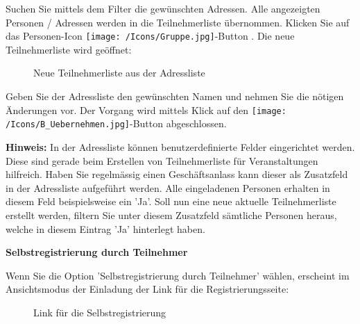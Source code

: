 Suchen Sie mittels dem Filter  die gewünschten Adressen. Alle angezeigten Personen / Adressen  werden in die Teilnehmerliste übernommen. Klicken Sie auf das Personen-Icon \texttt{[image: /Icons/Gruppe.jpg]}-Button .
Die neue Teilnehmerliste wird geöffnet:

\begin{figure}[H]
\caption{Neue Teilnehmerliste aus der Adressliste}
\end{figure}

Geben Sie der Adressliste den gewünschten Namen und nehmen Sie die nötigen Änderungen vor. Der Vorgang wird mittels Klick auf den \texttt{[image: /Icons/B\_Uebernehmen.jpg]}-Button  abgeschlossen.

\vspace{\baselineskip}

\textbf{Hinweis:} In der Adressliste können benutzerdefinierte Felder eingerichtet werden. Diese sind gerade beim Erstellen von Teilnehmerliste für Veranstaltungen hilfreich. Haben Sie regelmässig einen Geschäftsanlass kann dieser als Zusatzfeld in der Adressliste aufgeführt werden. Alle eingeladenen Personen erhalten in diesem Feld beispielsweise ein 'Ja'. Soll nun eine neue aktuelle Teilnehmerliste erstellt werden, filtern Sie unter diesem Zusatzfeld sämtliche Personen heraus, welche in diesem Eintrag 'Ja' hinterlegt haben.

\vspace{\baselineskip}

\textbf{Selbstregistrierung durch Teilnehmer}
\label{bkm:Ref2018072302}

Wenn Sie die Option 'Selbstregistrierung durch Teilnehmer' wählen, erscheint im Ansichtsmodus der Einladung der Link für die Registrierungsseite:

\begin{figure}[H]
\caption{Link für die Selbstregistrierung}
\end{figure}

